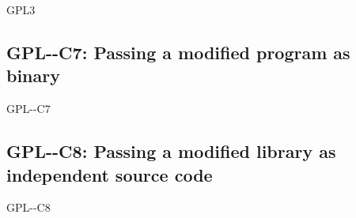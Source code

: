 \begin{license}{GPL3}
\subsection{GPL-\ver-C7: Passing a modified program as binary}
\begin{lsuc}{GPL-\ver-C7}

  \useCaseSeven

  \begin{lsucrequires}
    \lsucmandatory{\keepLicenseElements}
    \lsucmandatory{\gplthreeEnsureCopyrightNoticeBinary}
    \lsucmandatory{\giveLicense}\passingFilesCorrectly
    \lsucmandatory{\retainCopyrightNotices}
    \lsucmandatory{\markProgramModifications}
    \lsucmandatory{\addToCopyrightDialogApp}
    \lsucmandatory{\arrangeProgramChanges}\howToApplyTheseTerms
    \lsucmandatory{\makeModifiedSourceAvailable}
    \lsucmandatory{\describeHowToGetSource}
    \lsucoptional{\createChangelog}
    \lsucoptional{\addToDocumentation}
  \end{lsucrequires}

  \begin{lsucprohibits}
    \lsucitem{\noPatentLitigation}
  \end{lsucprohibits}
\end{lsuc}

\subsection{GPL-\ver-C8: Passing a modified library as independent source code}
\begin{lsuc}{GPL-\ver-C8}

  \useCaseEight

  \begin{lsucrequires}
     \lsucmandatory{\keepLicenseElements}
    \lsucmandatory{\gplthreeEnsureCopyrightNoticeSource}
    \lsucmandatory{\giveLicense}\passingFilesCorrectly
    \lsucmandatory{\retainCopyrightNotices}
    \lsucmandatory{\markLibraryModifications}
    \lsucmandatory{\arrangeLibraryChanges}\howToApplyTheseTerms
    \lsucoptional{\createChangelog}
    \lsucoptional{\addToDocumentation}
  \end{lsucrequires}

  \begin{lsucprohibits}
    \lsucitem{\noPatentLitigation}
  \end{lsucprohibits}
\end{lsuc}


\end{license}
